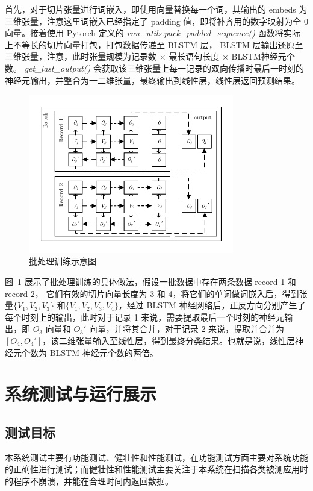 首先，对于切片张量进行词嵌入，即使用向量替换每一个词，其输出的 embeds 为三维张量，注意这里词嵌入已经指定了 padding 值，即将补齐用的数字映射为全 0 向量。接着使用 Pytorch 定义的 \textit{rnn\_utils.pack\_padded\_sequence()} 函数将实际上不等长的切片向量打包，打包数据传递至 BLSTM 层， BLSTM 层输出还原至三维张量，注意，此时张量规模为记录数 $\times$ 最长语句长度 $\times$ BLSTM神经元个数。 \textit{get\_last\_output()} 会获取该三维张量上每一记录的双向传播时最后一时刻的神经元输出，并整合为一二维张量，最终输出到线性层，线性层返回预测结果。

\begin{figure}[htbp]
    \centering
    \includegraphics[width=0.8\textwidth]{FIGs/chapter4/blstmFoward.pdf}
    \vspace{-0.5cm}
    \caption{批处理训练示意图}\label{blstmForward}
\end{figure}

图~\ref{blstmForward} 展示了批处理训练的具体做法，假设一批数据中存在两条数据 record 1 和 record 2， 它们有效的切片向量长度为 3 和 4，将它们的单词做词嵌入后，得到张量$\{V_{1},V_{2},V_{3}\}$ 和$\{V_{1},V_{2},V_{3},V_{4}\}$，经过 BLSTM 神经网络后，正反方向分别产生了每个时刻上的输出，此时对于记录 1 来说，需要提取最后一个时刻的神经元输出，即 $O_3$ 向量和 $O_3'$ 向量，并将其合并，对于记录 2 来说，提取并合并为 $\left[O_{4}, O_{4}'\right]$，该二维张量输入至线性层，得到最终分类结果。也就是说，线性层神经元个数为 BLSTM 神经元个数的两倍。

\section{系统测试与运行展示}
\subsection{测试目标}
本系统测试主要有功能测试、健壮性和性能测试，在功能测试方面主要对系统功能的正确性进行测试；而健壮性和性能测试主要关注于本系统在扫描各类被测应用时的程序不崩溃，并能在合理时间内返回数据。

